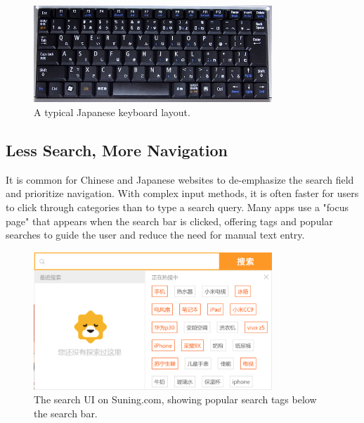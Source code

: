 \documentclass[11pt]{article}
\begin{document}
\begin{figure}[h!]
    \centering
    \includegraphics[width=0.8\textwidth]{image10.png}
    \caption{A typical Japanese keyboard layout.}
    \label{fig:japanese_keyboard}
\end{figure}

\subsection{Less Search, More Navigation}
It is common for Chinese and Japanese websites to de-emphasize the search field and prioritize navigation. With complex input methods, it is often faster for users to click through categories than to type a search query. Many apps use a "focus page" that appears when the search bar is clicked, offering tags and popular searches to guide the user and reduce the need for manual text entry.

\begin{figure}[h!]
    \centering
    \includegraphics[width=0.8\textwidth]{image15.png}
    \caption{The search UI on Suning.com, showing popular search tags below the search bar.}
    \label{fig:suning_ui}
\end{figure}
\end{document}
